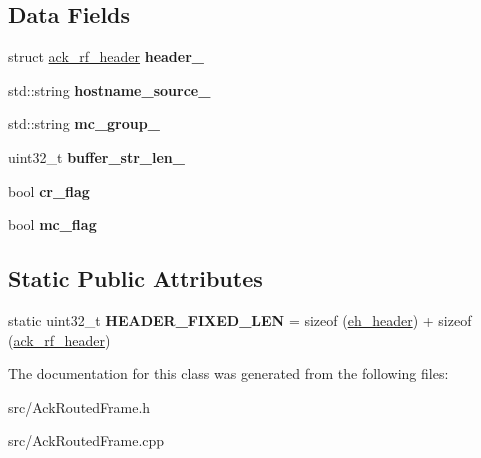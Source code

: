 \subsection*{Data Fields}
\begin{DoxyCompactItemize}
\item 
\hypertarget{classAckRoutedFrame_a8ed6f1c431816752761ca4449c639745}{struct \hyperlink{structack__rf__header}{ack\-\_\-rf\-\_\-header} {\bfseries header\-\_\-}}\label{classAckRoutedFrame_a8ed6f1c431816752761ca4449c639745}

\item 
\hypertarget{classAckRoutedFrame_ac358556a646d660a4e8a8861c368ee3a}{std\-::string {\bfseries hostname\-\_\-source\-\_\-}}\label{classAckRoutedFrame_ac358556a646d660a4e8a8861c368ee3a}

\item 
\hypertarget{classAckRoutedFrame_a58fa10cc3b9c106ab85e0652295ae4e0}{std\-::string {\bfseries mc\-\_\-group\-\_\-}}\label{classAckRoutedFrame_a58fa10cc3b9c106ab85e0652295ae4e0}

\item 
\hypertarget{classAckRoutedFrame_a76ab978d90be8f4594c982fabab5e9c3}{uint32\-\_\-t {\bfseries buffer\-\_\-str\-\_\-len\-\_\-}}\label{classAckRoutedFrame_a76ab978d90be8f4594c982fabab5e9c3}

\item 
\hypertarget{classAckRoutedFrame_a70643e91f2c5d16b1eee0ceef62846fd}{bool {\bfseries cr\-\_\-flag}}\label{classAckRoutedFrame_a70643e91f2c5d16b1eee0ceef62846fd}

\item 
\hypertarget{classAckRoutedFrame_a065ec75f6db7c7d03bb746fbab51bd24}{bool {\bfseries mc\-\_\-flag}}\label{classAckRoutedFrame_a065ec75f6db7c7d03bb746fbab51bd24}

\end{DoxyCompactItemize}
\subsection*{Static Public Attributes}
\begin{DoxyCompactItemize}
\item 
\hypertarget{classAckRoutedFrame_ad00f23365e9f2f0ad8e573e155946f4d}{static uint32\-\_\-t {\bfseries H\-E\-A\-D\-E\-R\-\_\-\-F\-I\-X\-E\-D\-\_\-\-L\-E\-N} = sizeof (\hyperlink{structeh__header}{eh\-\_\-header}) + sizeof (\hyperlink{structack__rf__header}{ack\-\_\-rf\-\_\-header})}\label{classAckRoutedFrame_ad00f23365e9f2f0ad8e573e155946f4d}

\end{DoxyCompactItemize}


The documentation for this class was generated from the following files\-:\begin{DoxyCompactItemize}
\item 
src/Ack\-Routed\-Frame.\-h\item 
src/Ack\-Routed\-Frame.\-cpp\end{DoxyCompactItemize}
